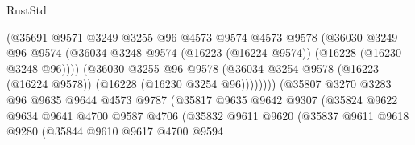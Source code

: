 \begin{lexlean}{RustStd}
\begin{coremodule}
                                    (@35691
                                      @9571
                                      @3249
                                      @3255
                                      @96
                                      @4573
                                      @9574
                                      @4573
                                      @9578
                                      (@36030
                                        @3249
                                        @96
                                        @9574
                                        (@36034
                                          @3248
                                          @9574
                                          (@16223 (@16224 @9574))
                                          (@16228 (@16230 @3248 @96))))
                                      (@36030
                                        @3255
                                        @96
                                        @9578
                                        (@36034
                                          @3254
                                          @9578
                                          (@16223 (@16224 @9578))
                                          (@16228 (@16230 @3254 @96))))))))
                              (@35807
                                @3270
                                @3283
                                @96
                                @9635
                                @9644
                                @4573
                                @9787
                                (@35817
                                  @9635
                                  @9642
                                  @9307
                                  (@35824
                                    @9622
                                    @9634
                                    @9641
                                    @4700
                                    @9587
                                    @4706
                                    (@35832
                                      @9611
                                      @9620
                                      (@35837
                                        @9611
                                        @9618
                                        @9280
                                        (@35844
                                          @9610
                                          @9617
                                          @4700
                                          @9594

\end{coremodule}
\end{lexlean}
